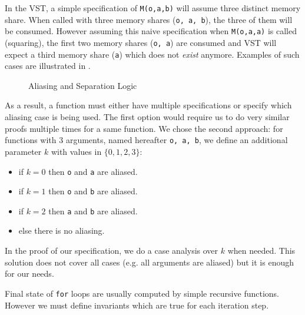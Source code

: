 In the VST, a simple specification of \texttt{M(o,a,b)} will assume three
distinct memory share. When called with three memory shares (\texttt{o, a, b}),
the three of them will be consumed. However assuming this naive specification
when \texttt{M(o,a,a)} is called (squaring), the first two memory shares (\texttt{o, a})
are consumed and VST will expect a third memory share (\texttt{a}) which does not \textit{exist} anymore.
Examples of such cases are illustrated in .
\begin{figure}[h]
  \centering
  
  \caption{Aliasing and Separation Logic}
  \label{tikz:MemSame}
\end{figure}

As a result, a function must either have multiple specifications or specify which
aliasing case is being used.
The first option would require us to do very similar proofs multiple times for a same function.
We chose the second approach: for functions with 3 arguments, named hereafter \texttt{o, a, b},
we define an additional parameter $k$ with values in $\{0,1,2,3\}$:
\begin{itemize}
  \item if $k=0$ then \texttt{o} and \texttt{a} are aliased.
  \item if $k=1$ then \texttt{o} and \texttt{b} are aliased.
  \item if $k=2$ then \texttt{a} and \texttt{b} are aliased.
  \item else there is no aliasing.
\end{itemize}
In the proof of our specification, we do a case analysis over $k$ when needed.
This solution does not cover all cases (e.g. all arguments are aliased) but it
is enough for our needs.

Final state of \texttt{for} loops are usually computed by simple recursive functions.
However we must define invariants which are true for each iteration step.

